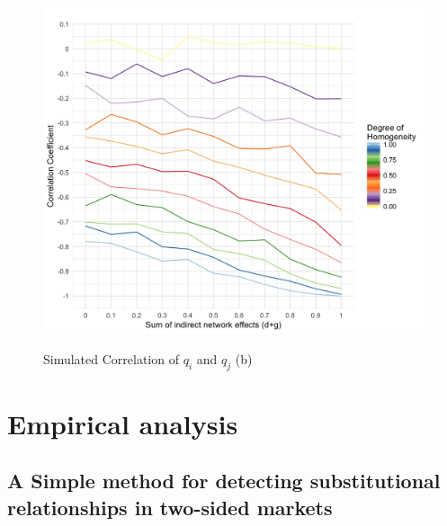\documentclass[12pt,a4paper,notitlepage]{article}
\begin{document}
\begin{figure}[H]
	\centering
	\caption{Simulated Correlation of $q_i$ and $q_j$ (b)}
	\begin{adjustbox}{width=\textwidth}	
	\includegraphics{figs/qqplot}
	\label{fig_QQ}
\end{adjustbox}
\end{figure}








\section{Empirical analysis}\label{empirical}

\subsection{A Simple method for detecting substitutional relationships in two-sided markets}
\end{document}
